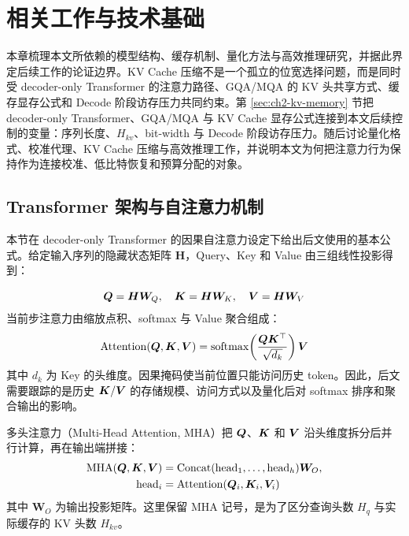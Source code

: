 
\chapter{相关工作与技术基础}
\label{chap:related-work}

本章梳理本文所依赖的模型结构、缓存机制、量化方法与高效推理研究，并据此界定后续工作的论证边界。KV Cache 压缩不是一个孤立的位宽选择问题，而是同时受 decoder-only Transformer 的注意力路径、GQA/MQA 的 KV 头共享方式、缓存显存公式和 Decode 阶段访存压力共同约束。第 \ref{sec:ch2-kv-memory} 节把 decoder-only Transformer、GQA/MQA 与 KV Cache 显存公式连接到本文后续控制的变量：序列长度、$H_{kv}$、bit-width 与 Decode 阶段访存压力。随后讨论量化格式、校准代理、KV Cache 压缩与高效推理工作，并说明本文为何把注意力行为保持作为连接校准、低比特恢复和预算分配的对象。


\section{Transformer 架构与自注意力机制}

本节在 decoder-only Transformer 的因果自注意力设定下给出后文使用的基本公式。给定输入序列的隐藏状态矩阵 $\bm{H}$，Query、Key 和 Value 由三组线性投影得到：

\begin{equation}
  \bm{Q} = \bm{H}\bm{W}_Q, \quad \bm{K} = \bm{H}\bm{W}_K, \quad \bm{V} = \bm{H}\bm{W}_V
  \label{eq:qkv_proj}
\end{equation}
当前步注意力由缩放点积、softmax 与 Value 聚合组成：
\begin{equation}
  \mathrm{Attention}(\bm{Q},\bm{K},\bm{V})
    = \mathrm{softmax}\!\left(\frac{\bm{Q} \bm{K}^\top}{\sqrt{d_k}}\right)\bm{V}
  \label{eq:attention}
\end{equation}
其中 $d_k$ 为 Key 的头维度。因果掩码使当前位置只能访问历史 token。因此，后文需要跟踪的是历史 $\bm{K}/\bm{V}$ 的存储规模、访问方式以及量化后对 softmax 排序和聚合输出的影响。

多头注意力（Multi-Head Attention, MHA）把 $\bm{Q}$、$\bm{K}$ 和 $\bm{V}$ 沿头维度拆分后并行计算，再在输出端拼接：
\begin{equation}
  \begin{aligned}
    \mathrm{MHA}(\bm{Q},\bm{K},\bm{V})
      &= \mathrm{Concat}(\mathrm{head}_1,\ldots,\mathrm{head}_h)\bm{W}_O, \\
    \mathrm{head}_i
      &= \mathrm{Attention}(\bm{Q}_i,\bm{K}_i,\bm{V}_i)
  \end{aligned}
  \label{eq:mha}
\end{equation}
其中 $\bm{W}_O$ 为输出投影矩阵。这里保留 MHA 记号，是为了区分查询头数 $H_q$ 与实际缓存的 KV 头数 $H_{kv}$。

